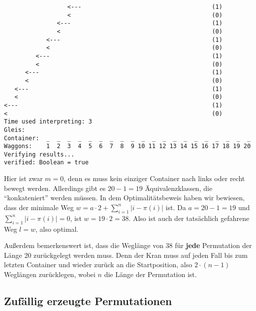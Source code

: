 \begin{lstlisting}
                  <---                                     (1)
                  <                                        (0)
               <---                                        (1)
               <                                           (0)
            <---                                           (1)
            <                                              (0)
         <---                                              (1)
         <                                                 (0)
      <---                                                 (1)
      <                                                    (0)
   <---                                                    (1)
   <                                                       (0)
<---                                                       (1)
<                                                          (0)
Time used interpreting: 3
Gleis: 
Container:  _  _  _  _  _  _  _  _  _  _  _  _  _  _  _  _  _  _  _  _
Waggons:    1  2  3  4  5  6  7  8  9 10 11 12 13 14 15 16 17 18 19 20
Verifying results...
verified: Boolean = true
\end{lstlisting}
Hier ist zwar $m = 0$, denn es muss kein einziger Container nach links oder recht bewegt werden.
Allerdings gibt es $20-1=19$ Äquivalenzklassen, die ``konkateniert'' werden müssen.
In dem Optimalitätsbeweis haben wir bewiesen, dass der minimale Weg $w = a \cdot 2 + \sum_{i = 1}^{n}{\lvert i-\pi(i)\rvert}$ ist.
Da $a=20-1=19$ und $\sum_{i = 1}^{n}{\lvert i-\pi(i)\rvert} = 0$, ist $w = 19 \cdot 2 = 38$. Also ist auch der tatsächlich gefahrene Weg $l = w$, also optimal.

Außerdem bemerkenswert ist, dass die Weglänge von 38 für \textbf{jede} Permutation der Länge 20 zurückgelegt werden muss.
Denn der Kran muss auf jeden Fall bis zum letzten Container und wieder zurück an die Startposition, also $2 \cdot (n-1)$ Weglängen zurücklegen, wobei $n$ die Länge der Permutation ist.
\subsection{Zufällig erzeugte Permutationen}
\label{random_perms}
